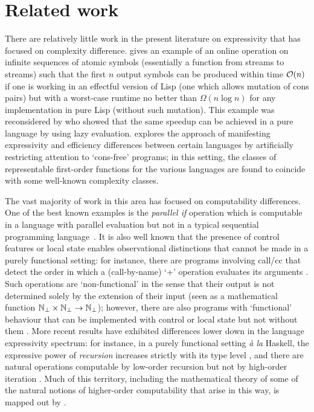 \documentclass[12pt,phd,lfcs,twoside,openright,logo,leftchapter,normalheadings]{infthesis}
\theoremstyle{plain}
\theoremstyle{definition}
\begin{document}
\section{Related work}
There are relatively little work in the present literature on
expressivity that has focused on complexity difference.
%
\citet{Pippenger96} gives an example of an online operation on
infinite sequences of atomic symbols (essentially a function from
streams to streams) such that the first $n$ output symbols can be
produced within time $\mathcal{O}(n)$ if one is working in an effectful
version of Lisp (one which allows mutation of cons pairs) but with a
worst-case runtime no better than $\Omega(n \log n)$ for any
implementation in pure Lisp (without such mutation). This example was
reconsidered by \citet{BirdJdM97} who showed that the same speedup can
be achieved in a pure language by using lazy evaluation.
\citet{Jones01} explores the approach of manifesting expressivity and
efficiency differences between certain languages by artificially
restricting attention to `cons-free' programs; in this setting, the
classes of representable first-order functions for the various
languages are found to coincide with some well-known complexity
classes.

The vast majority of work in this area has focused on computability
differences. One of the best known examples is the \emph{parallel if}
operation which is computable in a language with parallel evaluation
but not in a typical sequential programming
language~\cite{Plotkin77}. It is also well known that the presence of
control features or local state enables observational distinctions
that cannot be made in a purely functional setting: for instance,
there are programs involving call/cc that detect the order in which a
(call-by-name) `+' operation evaluates its arguments
\citep{CartwrightF92}. Such operations are `non-functional' in the
sense that their output is not determined solely by the extension of
their input (seen as a mathematical function
$\mathbb{N}_\bot \times \mathbb{N}_\bot \rightarrow \mathbb{N}_\bot$);
however, there are also programs with `functional' behaviour that can
be implemented with control or local state but not without them
\citep{Longley99}.  More recent results have exhibited differences
lower down in the language expressivity spectrum: for instance, in a
purely functional setting \textit{\`a la} Haskell, the expressive
power of \emph{recursion} increases strictly with its type level
\citep{Longley18a}, and there are natural operations computable by
low-order recursion but not by high-order iteration
\citep{Longley19}. Much of this territory, including the mathematical
theory of some of the natural notions of higher-order computability
that arise in this way, is mapped out by \citet{LongleyN15}.
\end{document}
